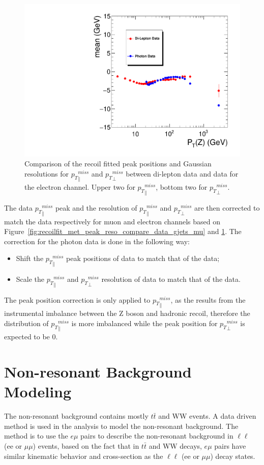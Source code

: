 \begin{figure}[htbp]
\begin{center}
\includegraphics[width=0.46\linewidth, page=7]{figures/plots_SingleEMU_Run2016Full_03Feb2017_allcorV2_met_para_study_ZSelecLowLPt_el_VS_SinglePhoton_Run2016Full_03Feb2017_allcorV2_NoRecoil_met_para_study_ZSelecLowLPt_el.pdf}
\caption{Comparison of the recoil fitted peak positions and Gaussian resolutions for ${p_{T}}^{miss}_\parallel$ and ${p_{T}}^{miss}_\perp$ between di-lepton data and \gjets data for the electron channel. Upper two for 
${p_{T}}^{miss}_\parallel$, bottom two for ${p_{T}}^{miss}_\perp$.}
\label{fig:recoilfit_met_peak_reso_compare_data_gjets_el}
\end{center}
\end{figure}

The \gjets data ${p_{T}}^{miss}_\parallel$ peak and the resolution of ${p_{T}}^{miss}_\parallel$ and ${p_{T}}^{miss}_\perp$ are then corrected to match the \Zjets data respectively for muon and electron channels based on Figure~\ref{fig:recoilfit_met_peak_reso_compare_data_gjets_mu} and \ref{fig:recoilfit_met_peak_reso_compare_data_gjets_el}. The correction for the photon data is done in the following way:
\begin{itemize}
\item Shift the ${p_{T}}^{miss}_\parallel$ peak positions of \gjets data to match that of the \Zjets data;
\item Scale the ${p_{T}}^{miss}_\parallel$ and ${p_{T}}^{miss}_\perp$ resolution of \gjets data to match that of the \Zjets data.
\end{itemize}

The peak position correction is only applied to ${p_{T}}^{miss}_\parallel$, as the \ptmiss results from the instrumental imbalance between the Z boson and hadronic recoil, therefore the distribution of ${p_{T}}^{miss}_\parallel$ is more imbalanced while the peak position for ${p_{T}}^{miss}_\perp$ is expected to be 0.

\clearpage
\section{Non-resonant Background Modeling}
The non-resonant background contains mostly $t\bar{t}$ and WW events. A data driven method is used in the analysis to model the non-resonant background. The method is to use the $e\mu$ pairs to describe the non-resonant background in $\ell\ell$ (ee or $\mu \mu$) events, based on the fact that in $t\bar{t}$ and WW decays, $e\mu$ pairs have similar kinematic behavior and cross-section as the $\ell\ell$ (ee or $\mu \mu$) decay states.

